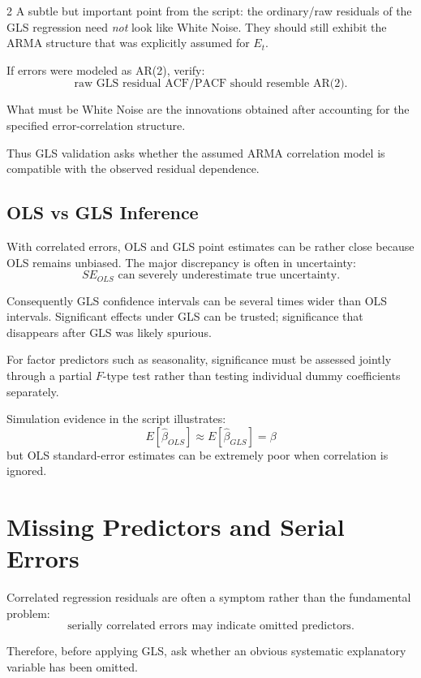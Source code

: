 \documentclass[9pt,a4paper]{extarticle}
\begin{document}
\begin{multicols}{2}
A subtle but important point from the script: the ordinary/raw residuals of the GLS regression need \emph{not} look like White Noise. They should still exhibit the ARMA structure that was explicitly assumed for \(E_t\).

If errors were modeled as AR(2), verify:
\[
\boxed{\text{raw GLS residual ACF/PACF should resemble AR(2).}}
\]

What must be White Noise are the innovations obtained after accounting for the specified error-correlation structure.

Thus GLS validation asks whether the assumed ARMA correlation model is compatible with the observed residual dependence.

\subsection{OLS vs GLS Inference}

With correlated errors, OLS and GLS point estimates can be rather close because OLS remains unbiased. The major discrepancy is often in uncertainty:
\[
\boxed{
SE_{OLS}\text{ can severely underestimate true uncertainty}.
}
\]

Consequently GLS confidence intervals can be several times wider than OLS intervals. Significant effects under GLS can be trusted; significance that disappears after GLS was likely spurious.

For factor predictors such as seasonality, significance must be assessed jointly through a partial \(F\)-type test rather than testing individual dummy coefficients separately.

Simulation evidence in the script illustrates:
\[
\boxed{
E[\widehat\beta_{OLS}]\approx
E[\widehat\beta_{GLS}]=\beta
}
\]
but OLS standard-error estimates can be extremely poor when correlation is ignored.

\section{Missing Predictors and Serial Errors}

Correlated regression residuals are often a symptom rather than the fundamental problem:
\[
\boxed{\text{serially correlated errors may indicate omitted predictors}.}
\]

Therefore, before applying GLS, ask whether an obvious systematic explanatory variable has been omitted.


\end{multicols}
\end{document}
